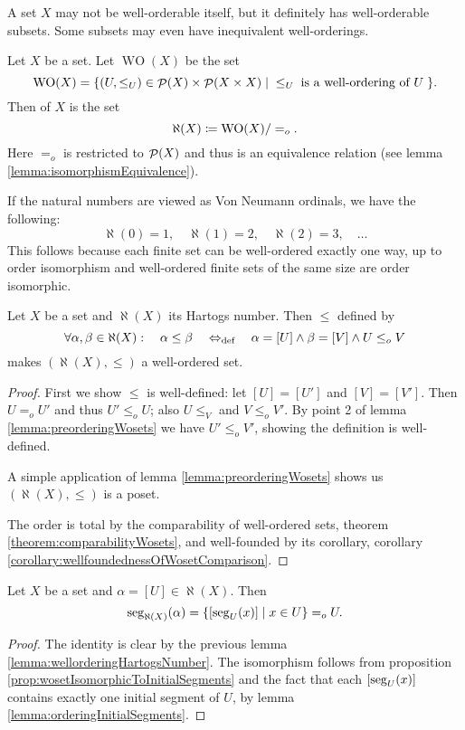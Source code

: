 A set $X$ may not be well-orderable itself, but it definitely has well-orderable subsets. Some subsets may even have inequivalent well-orderings.
\begin{definition}
Let $X$ be a set. Let $\operatorname{WO}(X)$ be the set
\[ \operatorname{WO}(X) = \{ (U,\leq_U) \in \mathop{\mathcal{P}}(X)\times\mathop{\mathcal{P}}(X\times X) \;|\; \leq_U\; \text{is a well-ordering of $U$}\;  \}. \]
Then  of $X$ is the set
\[ \aleph(X) \coloneqq \operatorname{WO}(X)/=_o. \]
Here $=_o$ is restricted to $\mathop{\mathcal{P}}(X)$ and thus is an equivalence relation (see lemma \ref{lemma:isomorphismEquivalence}).
\end{definition}
If the natural numbers are viewed as Von Neumann ordinals, we have the following:
\[ \aleph(0) = 1, \quad \aleph(1) = 2, \quad \aleph(2) = 3, \quad \ldots \]
This follows because each finite set can be well-ordered exactly one way, up to order isomorphism and well-ordered finite sets of the same size are order isomorphic.

\begin{lemma} \label{lemma:wellorderingHartogsNumber}
Let $X$ be a set and $\aleph(X)$ its Hartogs number. Then $\leq$ defined by
\[ \forall \alpha, \beta \in \aleph(X):\quad \alpha \leq \beta \quad\Leftrightarrow_{\text{def}}\quad \alpha = [U] \land \beta = [V] \land U\leq_o V \]
makes $(\aleph(X), \leq)$ a well-ordered set.
\end{lemma}
\begin{proof}
First we show $\leq$ is well-defined: let $[U] = [U']$ and $[V] = [V']$. Then $U =_o U'$ and thus $U'\leq_o U$; also $U \leq_V$ and $V\leq_o V'$. By point 2 of lemma \ref{lemma:preorderingWosets} we have $U' \leq_o V'$, showing the definition is well-defined.

A simple application of lemma \ref{lemma:preorderingWosets} shows us $(\aleph(X), \leq)$ is a poset.

The order is total by the comparability of well-ordered sets, theorem \ref{theorem:comparabilityWosets}, and well-founded by its corollary, corollary \ref{corollary:wellfoundednessOfWosetComparison}.
\end{proof}

\begin{lemma} \label{lemma:HartogsNumberAsOrdinal}
Let $X$ be a set and $\alpha = [U] \in \aleph(X)$. Then
\[ \operatorname{seg}_{\aleph(X)}(\alpha) = \{ [\operatorname{seg}_U(x)] \;|\; x\in U \} =_o U. \]
\end{lemma}
\begin{proof}
The identity is clear by the previous lemma \ref{lemma:wellorderingHartogsNumber}. The isomorphism follows from proposition \ref{prop:wosetIsomorphicToInitialSegments} and the fact that each $[\operatorname{seg}_U(x)]$ contains exactly one initial segment of $U$, by lemma \ref{lemma:orderingInitialSegments}.
\end{proof}

